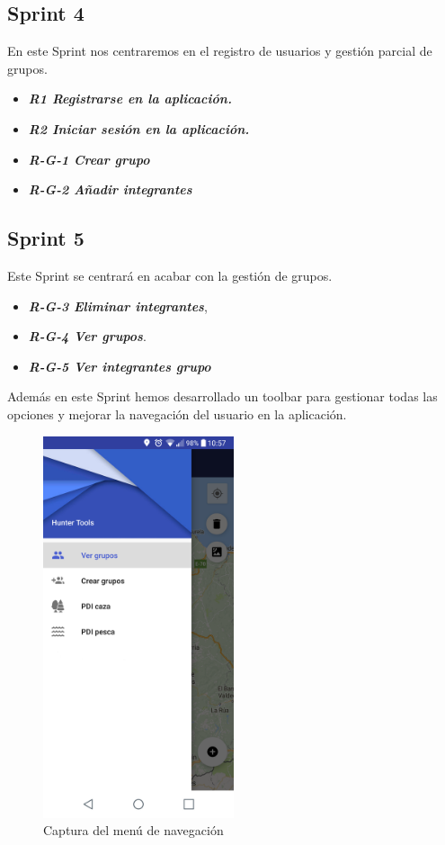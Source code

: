 \subsection{Sprint 4}

En este Sprint nos centraremos en el registro de usuarios y gestión parcial de grupos.



\begin{itemize}
\item\textbf{ \textit{R1  Registrarse en la aplicación.}}
\item \textbf{\textit{R2 Iniciar sesión en la aplicación. }}
\item\textbf{ \textit{R-G-1 Crear grupo}}
\item\textbf{\textit{ R-G-2 Añadir integrantes}}
\end{itemize} 

\subsection{Sprint 5}
Este Sprint se centrará en acabar con la gestión de grupos.
\begin{itemize}
\item \textbf{\textit{R-G-3 Eliminar integrantes}},
\item \textbf{\textit{R-G-4 Ver grupos}}.
\item \textbf{\textit{R-G-5 Ver integrantes grupo}}
\end{itemize}
Además en este Sprint hemos desarrollado un toolbar para gestionar todas las opciones y mejorar la navegación del usuario en la aplicación.
\begin{figure}[H]
		\centering
		\includegraphics[width=0.5\textwidth] {menu.png}
		\caption{Captura del menú de navegación}
	\end{figure}

